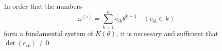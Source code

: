 In order that the numbers
$$\omega^{(i)} = \sum_{k=1}^{n} c_{ik} \theta^{k-1} \quad (c_{ik} \in k)$$
form a fundamental system of $K(\theta)$, it is necessary and sufficient that $\det(c_{ik}) \neq 0$.
